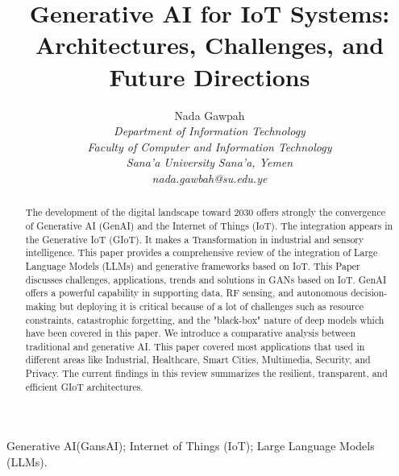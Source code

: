 \documentclass[journal]{IEEEtran}
\begin{document}
\title{Generative AI for IoT Systems: Architectures, Challenges, and Future Directions}

\author{Nada Gawpah\\
 \textit{Department of Information Technology}\\ 
 \textit{Faculty of Computer and Information Technology}\\
 \textit{Sana’a University}
\textit{ Sana’a, Yemen}\\
\textit {nada.gawbah@su.edu.ye}

}

\maketitle

\begin{abstract}
The development of the digital landscape toward 2030 offers strongly the convergence of Generative AI (GenAI) and the Internet of Things (IoT). The integration appears in the Generative IoT (GIoT). It makes a Transformation in industrial and sensory intelligence. This paper provides a comprehensive review of the integration of Large Language Models (LLMs) and generative frameworks based on IoT. This Paper discusses challenges, applications, trends and solutions in GANs based on IoT. GenAI offers a powerful capability in supporting data, RF sensing, and autonomous decision-making but deploying it is critical because of a lot of challenges such as resource constraints, catastrophic forgetting, and the "black-box" nature of deep models which have been covered in this paper. We introduce a comparative analysis between traditional and generative AI. This paper covered most applications that used in different areas like Industrial, Healthcare, Smart Cities, Multimedia, Security, and Privacy. The current findings in this review summarizes the resilient, transparent, and efficient GIoT architectures.
\end{abstract}

\begin{IEEEkeywords}
Generative AI(GansAI); Internet of Things (IoT); Large Language Models (LLMs).
\end{IEEEkeywords}
\end{document}
